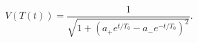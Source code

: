 \begin{equation}\label{vtt}
V(T(t)) =\frac{1}{\sqrt{1+\left(a_+e^{t/T_0}-a_-e^{-t/T_0}\right)^2}}.
\end{equation}

